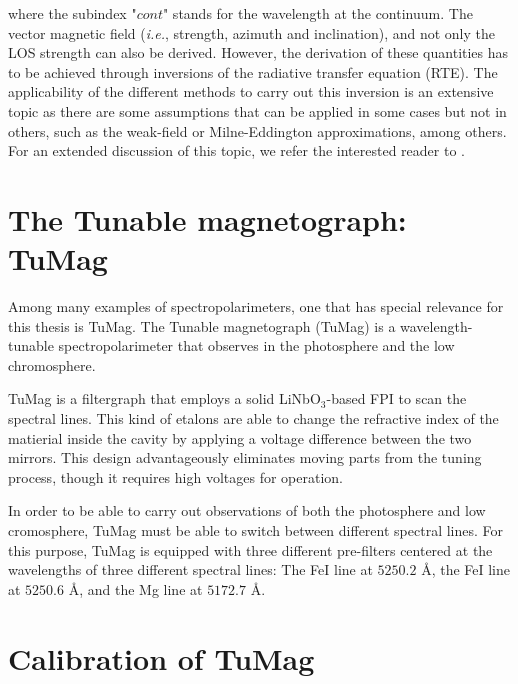 where the subindex "$cont$" stands for the wavelength at the continuum. The vector magnetic field (\textit{i.e.}, strength, azimuth and inclination), and not only the LOS strength can also be derived. However, the derivation of these quantities has to be achieved through inversions of the radiative transfer equation (RTE). The applicability of the different methods to carry out this inversion is an extensive topic as there are some assumptions that can be applied in some cases but not in others, such as the weak-field or Milne-Eddington approximations, among others. For an extended discussion of this topic, we refer the interested reader to \cite{del2016inversion}.   

\section{The Tunable magnetograph: TuMag}

Among many examples of spectropolarimeters, one that has special relevance for this thesis is TuMag. The Tunable magnetograph (TuMag) is a wavelength-tunable spectropolarimeter that observes in the photosphere and the low chromosphere. 

TuMag is a filtergraph that employs a solid LiNbO$_3$-based FPI to scan the spectral lines. This kind of etalons are able to change the refractive index of the matierial inside the cavity by applying a voltage difference between the two mirrors. This design advantageously eliminates moving parts from the tuning process, though it requires high voltages for operation. 

In order to be able to carry out observations of both the photosphere and low cromosphere, TuMag must be able to switch between different spectral lines. For this purpose, TuMag is equipped with three different pre-filters centered at the wavelengths of three different spectral lines: The FeI line at $5250.2$ \r{A}, the FeI line at $5250.6$ \r{A}, and the Mg line at $5172.7$ \r{A}.  


\section{Calibration of TuMag}
